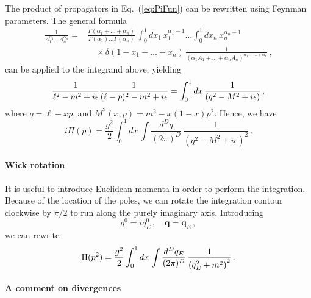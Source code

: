 The product of propagators in Eq.~(\ref{eq:PiFun}) can be rewritten
using Feynman parameters. The general formula
\begin{align}
  \frac{1}{A_1^{\alpha_1} \ldots A_n^{\alpha_n}}
  = & \frac{\Gamma(\alpha_1+\ldots +\alpha_n)}{\Gamma(\alpha_1)\ldots
      \Gamma(\alpha_n)}\, \int_0^1 dx_1\, x_1^{\alpha_1 -1} \ldots
      \int_0^1 dx_n\, x_n^{\alpha_n -1} \nonumber \\
    & \quad \times \delta\left(1-x_1-\ldots -x_n\right)\,
      \frac{1}{\left(\alpha_1 A_1 + \ldots + \alpha_n
      A_n\right)^{\alpha_1 + \ldots + \alpha_n}}\, , 
\end{align}
can be applied to the integrand above, yielding
\begin{align}
  \frac{1}{\ell^2-m^2+i\epsilon} \frac{1}{(\ell-p)^2-m^2+i\epsilon} = \int_0^1dx\,
  \frac{1}{\left(q^2-M^2 +i\epsilon\right)}\, ,
\end{align}
where $q=\ell-xp$, and $M^2(x,p)=m^2-x(1-x)p^2$. Hence, we have
\begin{equation}
  \label{eq:PiAfterFeynPar}
  i\Pi(p) = \frac{g^2}{2} \int_0^1dx\, \int \frac{d^Dq}{(2\pi)^D}\, 
  \frac{1}{\left(q^2-M^2 +i\epsilon\right)^2}\, .
\end{equation}

\paragraph{Wick rotation}

It is useful to introduce Euclidean momenta in order to perform the
integration. Because of the location of the poles, we can rotate the
integration contour clockwise by $\pi/2$ to run along the purely
imaginary axis. Introducing
\begin{equation}
  \label{eq:EuclideanMom}
  q^0 = i q^0_E\, , \quad \mathbf{q} = \mathbf{q}_E\, ,
\end{equation}
we can rewrite
\begin{equation}
  \label{eq:PiEuclMom}
  \Pi(p^2) = \frac{g^2}{2} \int_0^1dx\, \int \frac{d^Dq_E}{(2\pi)^D}\, 
  \frac{1}{\left(q_E^2+m^2\right)^2}\, .
\end{equation}

\paragraph{A comment on divergences}

